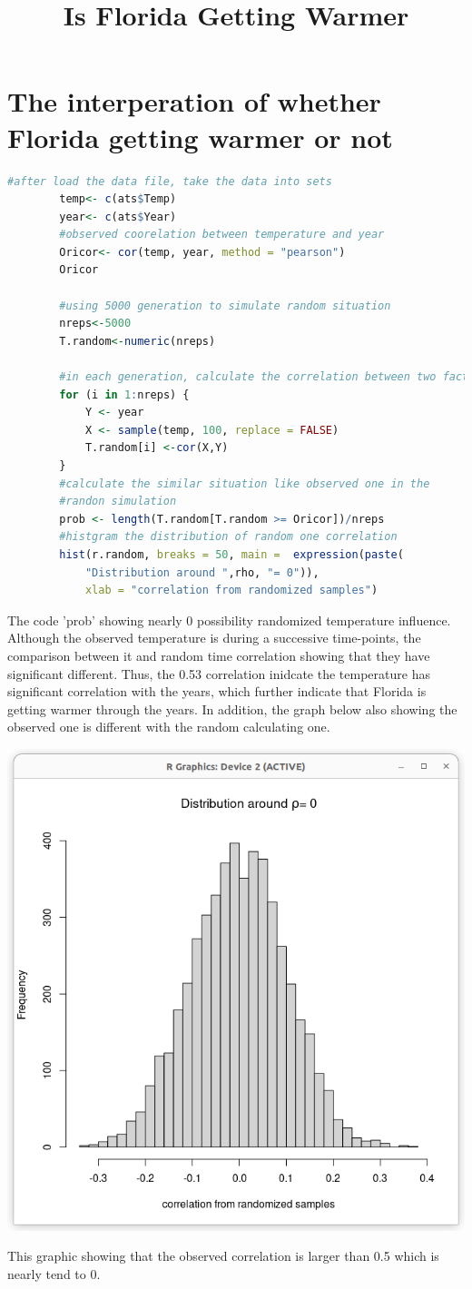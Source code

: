 \documentclass[8pt]{article}
\title{Is Florida Getting Warmer}
\begin{document}
    \section{The interperation of whether Florida getting warmer or not}
    \begin{lstlisting}[language=R]
        #after load the data file, take the data into sets
        temp<- c(ats$Temp)
        year<- c(ats$Year)
        #observed coorelation between temperature and year
        Oricor<- cor(temp, year, method = "pearson")
        Oricor

        #using 5000 generation to simulate random situation
        nreps<-5000
        T.random<-numeric(nreps)
            
        #in each generation, calculate the correlation between two factors
        for (i in 1:nreps) {
            Y <- year
            X <- sample(temp, 100, replace = FALSE)   
            T.random[i] <-cor(X,Y)
        }
        #calculate the similar situation like observed one in the 
        #randon simulation
        prob <- length(T.random[T.random >= Oricor])/nreps
        #histgram the distribution of random one correlation
        hist(r.random, breaks = 50, main =  expression(paste(
            "Distribution around ",rho, "= 0")), 
            xlab = "correlation from randomized samples")
        \end{lstlisting}
    
    The code 'prob' showing nearly 0 possibility randomized temperature influence.
    Although the observed temperature is during a successive time-points, the comparison 
    between it and random time correlation showing that they have significant different.
    Thus, the 0.53 correlation inidcate the temperature has significant correlation with the years,
    which further indicate that Florida is getting warmer through the years. In addition, the
    graph below also showing the observed one is different with the random calculating one.
    
    \includegraphics[width=\textwidth]{distribution around T}
    
    This graphic showing that the observed correlation is larger than 0.5 which is nearly tend to 0.
\end{document}
